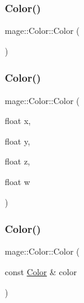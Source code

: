 \subsubsection{\texorpdfstring{Color()}{Color()}\hspace{0.1cm}{\footnotesize\ttfamily [1/4]}}
{\footnotesize\ttfamily mage\+::\+Color\+::\+Color (\begin{DoxyParamCaption}{ }\end{DoxyParamCaption})}

\hypertarget{structmage_1_1_color_ae906a0c456f1d21df8a6d5476918a913}{}\label{structmage_1_1_color_ae906a0c456f1d21df8a6d5476918a913} 
\subsubsection{\texorpdfstring{Color()}{Color()}\hspace{0.1cm}{\footnotesize\ttfamily [2/4]}}
{\footnotesize\ttfamily mage\+::\+Color\+::\+Color (\begin{DoxyParamCaption}\item[{float}]{x,  }\item[{float}]{y,  }\item[{float}]{z,  }\item[{float}]{w }\end{DoxyParamCaption})}

\hypertarget{structmage_1_1_color_aabf202b6ec0c2d1fc788c9bc69f185ff}{}\label{structmage_1_1_color_aabf202b6ec0c2d1fc788c9bc69f185ff} 
\subsubsection{\texorpdfstring{Color()}{Color()}\hspace{0.1cm}{\footnotesize\ttfamily [3/4]}}
{\footnotesize\ttfamily mage\+::\+Color\+::\+Color (\begin{DoxyParamCaption}\item[{const \hyperlink{structmage_1_1_color}{Color} \&}]{color }\end{DoxyParamCaption})}

\hypertarget{structmage_1_1_color_ab70f74c89738d5d60a8ac2c46c0be69e}{}\label{structmage_1_1_color_ab70f74c89738d5d60a8ac2c46c0be69e} 
